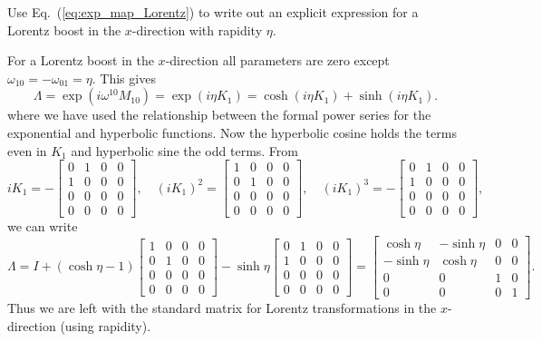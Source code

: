 \documentclass[notes.tex]{subfiles}
\begin{document}
\begin{Exercise}[label=ex:Lorentz_explicit_x]
Use Eq.~(\ref{eq:exp_map_Lorentz}) to write out an explicit expression for a Lorentz boost in the $x$-direction with rapidity $\eta$.
\end{Exercise}
\begin{Answer} 
For a Lorentz boost in the $x$-direction all parameters are zero except $\omega_{10}=-\omega_{01}=\eta$. This gives
\begin{equation*}
\Lambda = \exp(i\omega^{10}M_{10})= \exp(i\eta K_1)=\cosh(i\eta K_1)+\sinh(i\eta K_1).
\end{equation*}
where we have used the relationship between the formal power series for the exponential and hyperbolic functions. Now the hyperbolic cosine holds the terms even in $K_1$ and hyperbolic sine the odd terms. From
\[iK_1 = - \left[\begin{matrix} 0 & 1  & 0 &  0\\  1 & 0 & 0 & 0 \\  0 & 0 & 0 & 0 \\ 0 & 0 & 0 & 0 \end{matrix}\right], \quad
(iK_1)^2 = \left[\begin{matrix} 1 & 0  & 0 &  0\\  0 & 1 & 0 & 0 \\  0 & 0 & 0 & 0 \\ 0 & 0 & 0 & 0 \end{matrix}\right], \quad
(iK_1)^3 = -\left[\begin{matrix} 0 & 1  & 0 &  0\\  1 & 0 & 0 & 0 \\  0 & 0 & 0 & 0 \\ 0 & 0 & 0 & 0 \end{matrix}\right], \]
we can write
\begin{equation*}
\Lambda = I+ (\cosh\eta-1)\left[\begin{matrix} 1 & 0  & 0 &  0\\  0 & 1 & 0 & 0 \\  0 & 0 & 0 & 0 \\ 0 & 0 & 0 & 0 \end{matrix}\right]-\sinh\eta\left[\begin{matrix} 0 & 1  & 0 &  0\\  1 & 0 & 0 & 0 \\  0 & 0 & 0 & 0 \\ 0 & 0 & 0 & 0 \end{matrix}\right]
=\left[\begin{matrix} \cosh\eta & -\sinh\eta  & 0 & 0 \\  -\sinh\eta & \cosh\eta & 0 & 0 \\  0 & 0 & 1 & 0 \\ 0 & 0 & 0 & 1 \end{matrix}\right].
\end{equation*}
Thus we are left with the standard matrix for Lorentz transformations in the $x$-direction (using rapidity).
\end{Answer}
\end{document}
